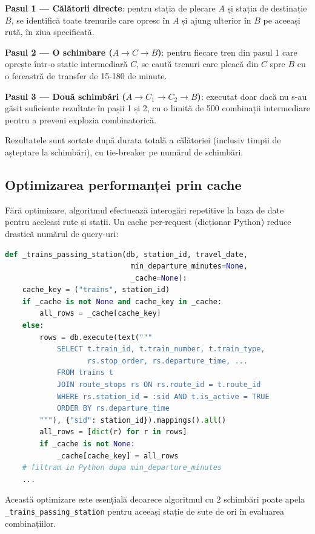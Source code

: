 \documentclass[12pt,a4paper]{report}
\begin{document}
\textbf{Pasul 1 — Călătorii directe}: pentru stația de plecare $A$ și stația de destinație $B$, se identifică toate trenurile care opresc în $A$ și ajung ulterior în $B$ pe aceeași rută, în ziua specificată.

\textbf{Pasul 2 — O schimbare ($A \to C \to B$)}: pentru fiecare tren din pasul 1 care oprește într-o stație intermediară $C$, se caută trenuri care pleacă din $C$ spre $B$ cu o fereastră de transfer de 15-180 de minute.

\textbf{Pasul 3 — Două schimbări ($A \to C_1 \to C_2 \to B$)}: executat doar dacă nu s-au găsit suficiente rezultate în pașii 1 și 2, cu o limită de 500 combinații intermediare pentru a preveni explozia combinatorică.

Rezultatele sunt sortate după durata totală a călătoriei (inclusiv timpii de așteptare la schimbări), cu tie-breaker pe numărul de schimbări.

\subsection{Optimizarea performanței prin cache}

Fără optimizare, algoritmul efectuează interogări repetitive la baza de date pentru aceleași rute și stații. Un cache per-request (dicționar Python) reduce drastică numărul de query-uri:

\begin{lstlisting}[language=Python, caption=Cache per-request în trip\_planner.py]
def _trains_passing_station(db, station_id, travel_date,
                             min_departure_minutes=None,
                             _cache=None):
    cache_key = ("trains", station_id)
    if _cache is not None and cache_key in _cache:
        all_rows = _cache[cache_key]
    else:
        rows = db.execute(text("""
            SELECT t.train_id, t.train_number, t.train_type,
                   rs.stop_order, rs.departure_time, ...
            FROM trains t
            JOIN route_stops rs ON rs.route_id = t.route_id
            WHERE rs.station_id = :sid AND t.is_active = TRUE
            ORDER BY rs.departure_time
        """), {"sid": station_id}).mappings().all()
        all_rows = [dict(r) for r in rows]
        if _cache is not None:
            _cache[cache_key] = all_rows
    # filtram in Python dupa min_departure_minutes
    ...
\end{lstlisting}

Această optimizare este esențială deoarece algoritmul cu 2 schimbări poate apela \texttt{\_trains\_passing\_station} pentru aceeași stație de sute de ori în evaluarea combinațiilor.
\end{document}
